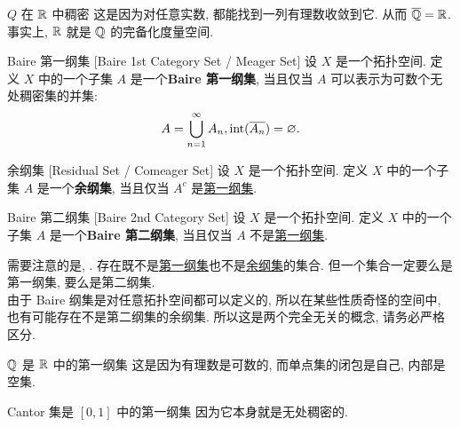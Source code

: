         \begin{ins}
            {\(Q\) 在 \(\operatorname{\mathbb{R}}\) 中稠密}
            这是因为对任意实数, 都能找到一列有理数收敛到它. 从而 \(\overline{\operatorname{\mathbb{Q}}}=\operatorname{\mathbb{R}}\).\\
            事实上, \(\operatorname{\mathbb{R}}\) 就是 \(\operatorname{\mathbb{Q}}\) 的完备化度量空间.
        \end{ins}

        \begin{dfn}
            [meager]
            {Baire 第一纲集}
            [Baire 1st Category Set / Meager Set]
            设 \(X\) 是一个拓扑空间. 定义 \(X\) 中的一个子集 \(A\) 是一个\textbf{Baire 第一纲集}, 当且仅当 \(A\) 可以表示为可数个无处稠密集的并集:
            \[A=\bigcup_{n=1}^\infty A_n, \operatorname{int}(\overline{A_n})=\varnothing.\]
        \end{dfn}

        \begin{dfn}
            [residual]
            {余纲集}
            [Residual Set / Comeager Set]
            设 \(X\) 是一个拓扑空间. 定义 \(X\) 中的一个子集 \(A\) 是一个\textbf{余纲集}, 当且仅当 \(A^c\) 是\hyperref[dfn:meager]{第一纲集}.
        \end{dfn}

        \begin{dfn}
            {Baire 第二纲集}
            [Baire 2nd Category Set]
            设 \(X\) 是一个拓扑空间. 定义 \(X\) 中的一个子集 \(A\) 是一个\textbf{Baire 第二纲集}, 当且仅当 \(A\) 不是\hyperref[dfn:meager]{第一纲集}.
        \end{dfn}

        \begin{rmk}
            [Dedicatia]
            需要注意的是, . 存在既不是\hyperref[dfn:meager]{第一纲集}也不是\hyperref[dfn:residual]{余纲集}的集合. 但一个集合一定要么是第一纲集, 要么是第二纲集.\\
            由于 Baire 纲集是对任意拓扑空间都可以定义的, 所以在某些性质奇怪的空间中, 也有可能存在不是第二纲集的余纲集. 所以这是两个完全无关的概念, 请务必严格区分. 
        \end{rmk}

        \begin{ins}
            {\(\operatorname{\mathbb{Q}}\) 是 \(\operatorname{\mathbb{R}}\) 中的第一纲集}
            这是因为有理数是可数的, 而单点集的闭包是自己, 内部是空集.
        \end{ins}

        \begin{ins}
            {Cantor 集是 \([0,1]\) 中的第一纲集}
            因为它本身就是无处稠密的.
        \end{ins}

